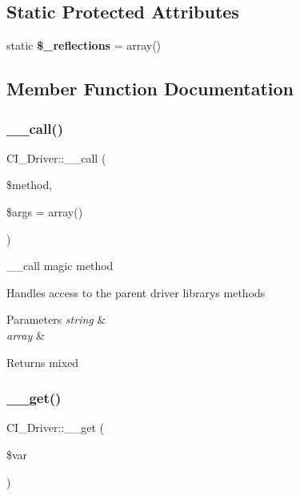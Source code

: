 \subsection*{Static Protected Attributes}
\begin{DoxyCompactItemize}
\item 
\mbox{\label{class_c_i___driver_a658c8a318e258a2f87b1ffa9fec42c94}} 
static {\bfseries \$\+\_\+reflections} = array()
\end{DoxyCompactItemize}


\subsection{Member Function Documentation}
\mbox{\label{class_c_i___driver_a480efce8b312c1f295525f961f532cc1}} 
\subsubsection{\texorpdfstring{\+\_\+\+\_\+call()}{\_\_call()}}
{\footnotesize\ttfamily C\+I\+\_\+\+Driver\+::\+\_\+\+\_\+call (\begin{DoxyParamCaption}\item[{}]{\$method,  }\item[{}]{\$args = {\ttfamily array()} }\end{DoxyParamCaption})}

\+\_\+\+\_\+call magic method

Handles access to the parent driver library\textquotesingle{}s methods


\begin{DoxyParams}{Parameters}
{\em string} & \\
\hline
{\em array} & \\
\hline
\end{DoxyParams}
\begin{DoxyReturn}{Returns}
mixed 
\end{DoxyReturn}
\mbox{\label{class_c_i___driver_af77f8c79a6ce39b77af925a99d255b64}} 
\subsubsection{\texorpdfstring{\+\_\+\+\_\+get()}{\_\_get()}}
{\footnotesize\ttfamily C\+I\+\_\+\+Driver\+::\+\_\+\+\_\+get (\begin{DoxyParamCaption}\item[{}]{\$var }\end{DoxyParamCaption})}

